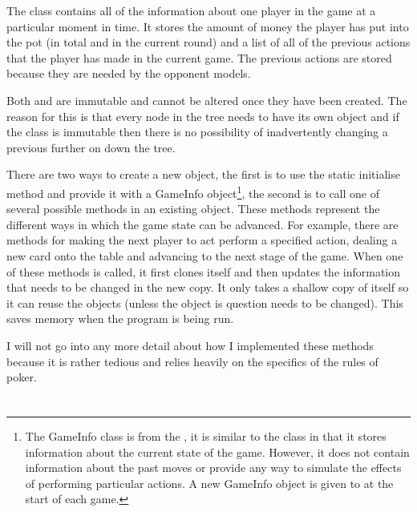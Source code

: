 The \player class contains all of the information about one player in the game at a particular moment in time. It stores the amount of money the player has put into the pot (in total and in the current round) and a list of all of the previous actions that the player has made in the current game. The previous actions are stored because they are needed by the opponent models.

Both \gs and \player are immutable and cannot be altered once they have been created. The reason for this is that every node in the tree needs to have its own \gs object and if the class is immutable then there is no possibility of inadvertently changing a previous \gs further on down the tree. 

There are two ways to create a new \gs object, the first is to use the static initialise method and provide it with a GameInfo object\footnote{The GameInfo class is from the \meer, it is similar to the \gs class in that it stores information about the current state of the game. However, it does not contain information about the past moves or provide any way to simulate the effects of performing particular actions. A new GameInfo object is given to \mbt at the start of each game.}, the second is to call one of several possible methods in an existing \gs object. These methods represent the different ways in which the game state can be advanced. For example, there are methods for making the next player to act perform a specified action, dealing a new card onto the table and advancing to the next stage of the game. When one of these methods is called, it first clones itself and then updates the information that needs to be changed in the new copy. It only takes a shallow copy of itself so it can reuse the \player objects (unless the \player object is question needs to be changed). This saves memory when the program is being run. 

I will not go into any more detail about how I implemented these methods because it is rather tedious and relies heavily on the specifics of the rules of poker.




\section{\mcts}									%

